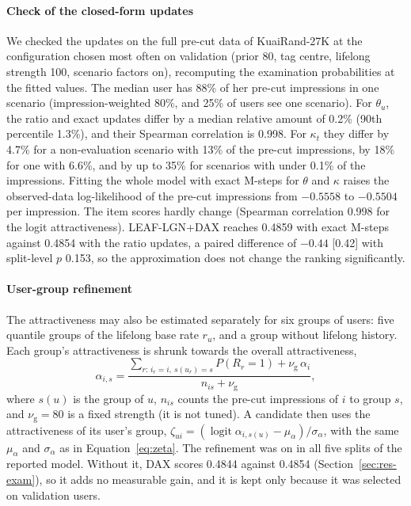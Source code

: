 \documentclass[preprint,12pt,authoryear]{elsarticle}
\begin{document}
\paragraph{Check of the closed-form updates} We checked the updates on the full pre-cut data of KuaiRand-27K at the configuration chosen most
often on validation (prior 80, tag centre, lifelong strength 100, scenario factors on), recomputing the examination probabilities at the fitted
values. The median user has 88\% of her pre-cut impressions in one scenario (impression-weighted 80\%, and 25\% of users see one scenario). For
$\theta_u$, the ratio and exact updates differ by a median relative amount of 0.2\% (90th percentile 1.3\%), and their Spearman correlation is
0.998. For $\kappa_t$ they differ by 4.7\% for a non-evaluation scenario with 13\% of the pre-cut impressions, by 18\% for one with 6.6\%, and by up
to 35\% for scenarios with under 0.1\% of the impressions. Fitting the whole model with exact M-steps for $\theta$ and $\kappa$ raises the
observed-data log-likelihood of the pre-cut impressions from $-0.5558$ to $-0.5504$ per impression. The item scores hardly change (Spearman
correlation 0.998 for the logit attractiveness). LEAF-LGN+DAX reaches 0.4859 with exact M-steps against 0.4854 with the ratio updates, a paired
difference of $-0.44$ [0.42] with split-level $p$ 0.153, so the approximation does not change the ranking significantly.

\paragraph{User-group refinement} The attractiveness may also be estimated separately for six groups of users: five quantile groups of the lifelong
base rate $r_u$, and a group without lifelong history. Each group's attractiveness is shrunk towards the overall attractiveness,
\[
\alpha_{i,s}=\frac{\sum_{r:\,i_r=i,\ s(u_r)=s}P(R_r=1)+\nu_{\mathrm g}\,\alpha_i}{n_{is}+\nu_{\mathrm g}},
\]
where $s(u)$ is the group of $u$, $n_{is}$ counts the pre-cut impressions of $i$ to group $s$, and $\nu_{\mathrm g}=80$ is a fixed strength (it is not
tuned). A candidate then uses the attractiveness of its user's group, $\zeta_{ui}=(\operatorname{logit}\alpha_{i,s(u)}-\mu_\alpha)/\sigma_\alpha$, with the same
$\mu_\alpha$ and $\sigma_\alpha$ as in Equation~\eqref{eq:zeta}. The refinement was on in all five splits of the reported model. Without it, DAX
scores 0.4844 against 0.4854 (Section~\ref{sec:res-exam}), so it adds no measurable gain, and it is kept only because it was selected on validation users.
\end{document}
